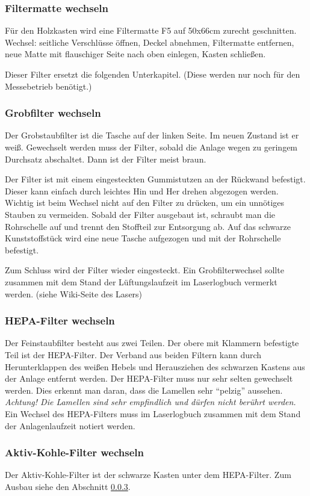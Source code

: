 \documentclass{\basedir/fablab-document}
\begin{document}
\subsubsection{Filtermatte wechseln}
Für den Holzkasten wird eine Filtermatte F5 auf 50x66cm zurecht geschnitten.
Wechsel: seitliche Verschlüsse öffnen, Deckel abnehmen, Filtermatte entfernen, neue Matte mit flauschiger Seite nach oben einlegen, Kasten schließen.

Dieser Filter ersetzt die folgenden Unterkapitel. (Diese werden nur noch für den Messebetrieb benötigt.)
\subsubsection{Grobfilter wechseln}
Der Grobstaubfilter ist die Tasche auf der linken Seite. Im neuen Zustand ist er weiß. Gewechselt werden muss der Filter, sobald die Anlage wegen zu geringem Durchsatz abschaltet. Dann ist der Filter meist braun.

Der Filter ist mit einem eingesteckten Gummistutzen an der Rückwand befestigt. Dieser kann einfach durch leichtes Hin und Her drehen abgezogen werden. Wichtig ist beim Wechsel nicht auf den Filter zu drücken, um ein unnötiges Stauben zu vermeiden. Sobald der Filter ausgebaut ist, schraubt man die Rohrschelle auf und trennt den Stoffteil zur Entsorgung ab. Auf das schwarze Kunststoffstück wird eine neue Tasche aufgezogen und mit der Rohrschelle befestigt.

Zum Schluss wird der Filter wieder eingesteckt. Ein Grobfilterwechsel sollte zusammen mit dem Stand der Lüftungslaufzeit im Laserlogbuch vermerkt werden. (siehe Wiki-Seite des Lasers)
\subsubsection{HEPA-Filter wechseln}
\label{subsubsec:HEPA-Filter}
Der Feinstaubfilter besteht aus zwei Teilen. Der obere mit Klammern befestigte Teil ist der HEPA-Filter. Der Verband aus beiden Filtern kann durch Herunterklappen des weißen Hebels und Herausziehen des schwarzen Kastens aus der Anlage entfernt werden.
Der HEPA-Filter muss nur sehr selten gewechselt werden. Dies erkennt man daran, dass die Lamellen sehr \enquote{pelzig} aussehen. \emph{Achtung! Die Lamellen sind sehr empfindlich und dürfen nicht berührt werden.}
Ein Wechsel des HEPA-Filters muss im Laserlogbuch zusammen mit dem Stand der Anlagenlaufzeit notiert werden.
\subsubsection{Aktiv-Kohle-Filter wechseln}
Der Aktiv-Kohle-Filter ist der schwarze Kasten unter dem HEPA-Filter. Zum Ausbau siehe den Abschnitt \ref{subsubsec:HEPA-Filter}.
\end{document}
